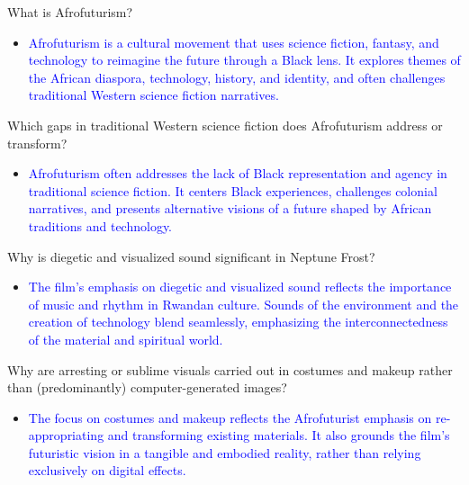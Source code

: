 \documentclass[11pt,fleqn]{book} %
\begin{document}
\begin{exercise}
What is Afrofuturism?
\begin{itemize}
\item \textcolor{blue}{Afrofuturism is a cultural movement that uses science fiction, fantasy, and technology to reimagine the future  through a Black lens.  It  explores themes of the African diaspora, technology, history, and identity, and often challenges traditional Western science fiction narratives.}
\end{itemize}
\end{exercise}

\begin{exercise}
Which gaps in traditional Western science fiction does Afrofuturism address or transform?
\begin{itemize}
    \item \textcolor{blue}{Afrofuturism often addresses the lack of Black representation and agency in traditional science fiction. It centers Black experiences, challenges colonial narratives, and presents alternative visions of a future shaped by African traditions and technology.}
\end{itemize}
\end{exercise}

\begin{exercise}
Why is diegetic and visualized sound significant in Neptune Frost?
\begin{itemize}
    \item \textcolor{blue}{The film's emphasis on diegetic and visualized sound reflects the importance of music and rhythm in Rwandan culture. Sounds of the environment and the creation of technology blend seamlessly, emphasizing  the interconnectedness of the material and spiritual world.}
\end{itemize}
\end{exercise}

\begin{exercise}
Why are arresting or sublime visuals carried out in costumes and makeup rather than (predominantly) computer-generated images?
\begin{itemize}
    \item \textcolor{blue}{The focus on costumes and makeup reflects the Afrofuturist emphasis on re-appropriating and transforming existing materials. It also grounds the film's futuristic vision in a tangible and embodied reality, rather than relying exclusively on digital effects.}
\end{itemize}
\end{exercise}
\end{document}
